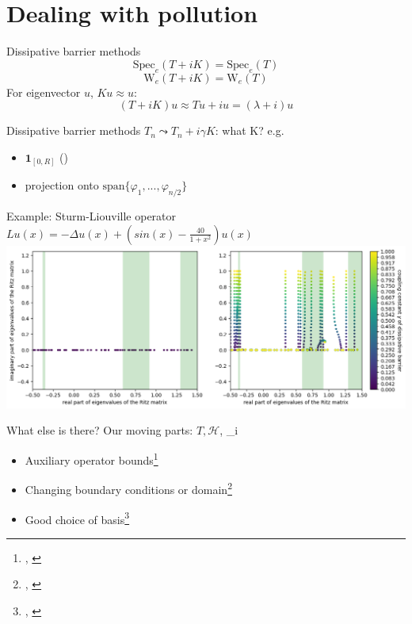 \documentclass[14pt]{beamer}
\newcommand{\Spec}{\mathrm{Spec}} %
\newcommand{\Num}{\mathrm{W}} %
\begin{document}
\section{Dealing with pollution}
\begin{frame}{Dissipative barrier methods}
  $$\Spec_e(T + iK) = \Spec_e(T)$$
  $$\Num_e(T + iK) = \Num_e(T)$$
  For eigenvector $u$, $Ku \approx u$:
  $$(T + iK)u \approx Tu + iu = (\lambda + i)u$$
\end{frame}

\begin{frame}{Dissipative barrier methods}
  $T_n \leadsto T_n + i\gamma K$: what K? e.g.
  \begin{itemize}
    \item $\mathbf{1}_{[0, R]}$ (\textcite{stepanenko2022spectral})
    \item projection onto $\mathrm{span}\{\varphi_1, ..., \varphi_{n/2}\}$
  \end{itemize}
\end{frame}

\begin{frame}{Example: Sturm-Liouville operator}
  \centering
  $Lu(x) = -\Delta u(x) + (sin(x) - \frac{40}{1+x^2})u(x)$
  \includegraphics[width=\textwidth]{aceto-coup-presentation}
\end{frame}

\begin{frame}{What else is there?}
  Our moving parts: $T,\mathcal{H}$, \varphi_i
  \begin{itemize}
    \item Auxiliary operator bounds\footnote{\textcite{levitin2002spectral}, \textcite{davies2003spectral}}
    \item Changing boundary conditions or domain\footnote{\textcite{cances2012periodic}, \textcite{aceto2006numerical}}
    \item Good choice of basis\footnote{\textcite{lewin2010spectral}, \textcite{boffi1999problem}}
  \end{itemize}
\end{frame}
\end{document}
